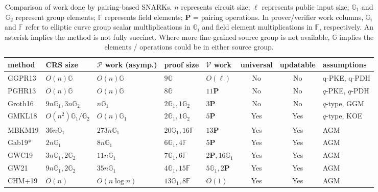 \begin{table}[!t]
\caption{Comparison of work done by pairing-based SNARKs. 
$n$ represents circuit size; $\ell$ represents public input size; $\mathbb{G}_1$ and 
$\mathbb{G}_2$ represent group elements; $\mathbb{F}$ represents field elements; $\mathbf{P}$ = pairing operations. 
In prover/verifier work columns, $\mathbb{G}_i$ and $\mathbb{F}$ refer to elliptic curve group scalar multliplications in $\mathbb{G}_i$ 
and field element multiplications in $\mathbb{F}$, respectively. An asterisk implies the method is not fully succinct. Where more fine-grained 
source group is not available, $\mathbb{G}$ implies the elements / operations could be in either source group.}
\label{tbl:snark}
\begin{tabular}{|l|l|l|p{3.2cm}|l|c|c|l|}
\hline
\toprule
method & CRS size & $\mathcal{P}$ work (asymp.) & proof size & $\mathcal{V}$ work & universal & updatable & assumptions \\ \hline\toprule
\midrule
GGPR13 & $O(n) \mathbb{G}$ & $O(n) \mathbb{G}$ & $9 \mathbb{G}$ & $O(\ell)$ & No & No & q-PKE, q-PDH \\ \hline
PGHR13 & $O(n) \mathbb{G}$ & $O(n) \mathbb{G}$ & $8 \mathbb{G}$ & $11 \mathbf{P}$ & No & No & $q$-PKE, $q$-PDH \\ \hline
Groth16 & $9n \mathbb{G}_1, 3n \mathbb{G}_2$ & $n \mathbb{G}_1$ & $2 \mathbb{G}_1, 1 \mathbb{G}_2$ & $3 \mathbf{P}$ & No & No & $q$-type, GGM \\ \hline
GMKL18 & $O(n^2) \mathbb{G}_1 / \mathbb{G}_2$ & $O(n) \mathbb{G}_1$ & $2 \mathbb{G}_1, 1 \mathbb{G}_2$ & $5 \mathbf{P}$ & Yes & Yes & $q$-type, KOE \\ \hline
MBKM19 & $36n \mathbb{G}_1$ & $273n \mathbb{G}_1$ & $20 \mathbb{G}_1, 16 \mathbb{F}$ & $13 \mathbf{P}$ & Yes & Yes & AGM \\ \hline
Gab19* & $2n \mathbb{G}_1$ & $8n \mathbb{G}_1$ & $6 \mathbb{G}_1, 4 \mathbb{F}$ & $5 \mathbf{P}$ & Yes & Yes & AGM \\ \hline
GWC19 & $3n \mathbb{G}_1, 2 \mathbb{G}_2$ & $11n \mathbb{G}_1$ & $7 \mathbb{G}_1, 6 \mathbb{F}$ & $2 \mathbf{P}, 16 \mathbb{G}_1$ & Yes & Yes & AGM \\ \hline
GW21 & $9n \mathbb{G}_1, 2 \mathbb{G}_2$ & $35n \mathbb{G}_1$ & $4 \mathbb{G}_1, 15 \mathbb{F}$ & $5 \mathbb{G}_1, 2 \mathbf{P}$ & Yes & Yes & AGM \\ \hline
CHM+19 & $O(n)$ & $O(n \log n)$ & $13 \mathbb{G}_1, 8 \mathbb{F}$ & $O(1)$ & Yes & Yes & AGM \\ \hline\bottomrule
\bottomrule
\bottomrule
\end{tabular}
\end{table}
